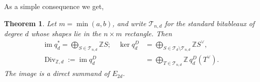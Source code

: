 \documentclass[10pt]{amsart}
\newtheorem{theorem}{Theorem}[section]
\theoremstyle{definition}
\theoremstyle{remark}
\newcommand{\Div}{\operatorname{Div}}
\begin{document}
As a simple consequence we get,  
\begin{theorem}
\label{thm:unimodularity-saturation}\label{thm:split}
Let $m=\min(a,b)$, and write $\mathcal T_{n,d}$ for the standard
bitableaux of degree $d$ whose shapes lie in the $n\times m$ rectangle.
Then
\begin{align}
\label{eq:kernel}
\operatorname{im}q_d^* =\bigoplus_{S\in  \mathcal T_{n,d}}\mathbb Z S;\quad \ker q_d^D&=\bigoplus_{S\in\mathcal T_{ d}\setminus \mathcal T_{n,d}}\mathbb Z S^\vee,\\
\label{eq:Div-basis-admissible}
\Div_{\mathbb Z,d}:=\operatorname{im}q_d^D
 &=\bigoplus_{T\in\mathcal T_{n,d}}\mathbb Z\,q_d^D(T^\vee).
\end{align}
The image is a  direct summand of $E_{2d}$.

\end{theorem}
\end{document}
